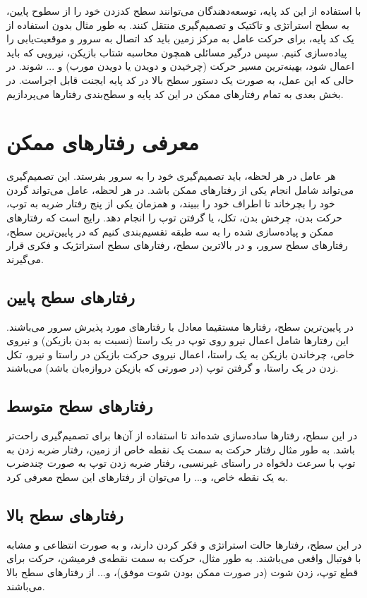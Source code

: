 با استفاده از این کد پایه، توسعه‌دهندگان می‌توانند سطح کدزدن خود را از سطوح پایین، به سطح استراتژی و تاکتیک و تصمیم‌گیری منتقل کنند. به طور مثال
بدون استفاده از یک کد پایه، برای حرکت عامل به مرکز زمین باید کد اتصال به سرور و موقعیت‌یابی را پیاده‌سازی کنیم. سپس درگیر مسائلی همچون محاسبه شتاب بازیکن، نیرویی که باید اعمال شود، بهینه‌ترین مسیر حرکت (چرخیدن و دویدن یا دویدن مورب)
 و ... شوند. در حالی که این عمل، به صورت یک دستور سطح بالا در کد پایه ایجنت قابل اجراست. در بخش بعدی به تمام رفتار‌های ممکن در این کد پایه و سطح‌بندی رفتار‌ها می‌پردازیم.

\section{معرفی رفتار‌های ممکن}
هر عامل در هر لحظه، باید تصمیم‌گیری خود را به سرور بفرستد.
این تصمیم‌گیری می‌تواند شامل انجام یکی از رفتار‌های ممکن باشد.
در هر لحظه، عامل می‌تواند گردن خود را بچرخاند تا اطراف خود را ببیند، و همزمان یکی از پنج رفتار ضربه به توپ، حرکت بدن، چرخش بدن، تکل، یا گرفتن توپ را انجام دهد.
رایج است که رفتار‌های ممکن و پیاده‌سازی شده را به سه طبقه تقسیم‌بندی کنیم که در پایین‌ترین سطح، رفتار‌های سطح‌ سرور، و در بالا‌ترین سطح، رفتار‌های سطح استراتژیک و فکری
قرار می‌گیرند.
\subsection{رفتار‌های سطح پایین}
در پایین‌ترین سطح، رفتار‌ها مستقیما معادل با رفتار‌های مورد پذیرش سرور می‌باشند.
این رفتار‌ها شامل اعمال نیرو روی توپ در یک راستا (نسبت به بدن بازیکن)
 و نیروی خاص، 
 چرخاندن بازیکن به یک راستا،
اعمال نیروی حرکت بازیکن در راستا و نیرو،
تکل زدن در یک راستا،
و گرفتن توپ (در صورتی که بازیکن دروازه‌بان باشد)
می‌باشند.

\subsection{رفتار‌های سطح متوسط}
در این سطح، رفتار‌ها ساده‌سازی شده‌اند تا استفاده‌ از آن‌ها برای تصمیم‌گیری راحت‌تر باشد. 
به طور مثال رفتار حرکت به سمت یک نقطه‌ خاص از زمین،
رفتار ضربه زدن به توپ با سرعت دلخواه در راستای غیرنسبی،
رفتار ضربه زدن توپ به صورت چند‌ضرب به یک نقطه خاص،
و...
را می‌توان از رفتار‌های این سطح معرفی کرد.
\subsection{رفتار‌های سطح بالا}
در این سطح، رفتار‌ها حالت استراتژی و فکر کردن دارند، و به صورت انتظاعی و مشابه با فوتبال واقعی می‌باشند.
به طور مثال، حرکت به سمت نقطه‌ی فرمیشن،
حرکت برای قطع توپ،
زدن شوت (در صورت ممکن بودن شوت موفق)،
و...
از رفتار‌های سطح بالا می‌باشند.
